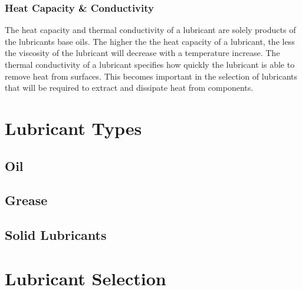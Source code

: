 \documentclass[a4paper,11pt]{article}
\begin{document}
\subsubsection{Heat Capacity \& Conductivity}

The heat capacity and thermal conductivity of a lubricant are solely products of the lubricants base oils. The higher the the heat capacity of a lubricant, the less the viscosity of the lubricant will decrease with a temperature increase. The thermal conductivity of a lubricant specifies how quickly the lubricant is able to remove heat from surfaces. This becomes important in the selection of lubricants that will be required to extract and dissipate heat from components. 


\section{Lubricant Types} 

\subsection{Oil}

\subsection{Grease}

\subsection{Solid Lubricants}

\section{Lubricant Selection}



\newpage
\onecolumn


\end{document}
